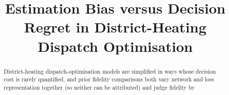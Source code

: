 \documentclass[a4paper,fleqn]{cas-sc}
\begin{document}
\title[mode=title]{%
  Estimation Bias versus Decision Regret in District-Heating Dispatch Optimisation}

\begin{abstract}
District-heating dispatch-optimisation models are simplified in ways whose decision
cost is rarely quantified, and prior fidelity comparisons both vary network and loss
representation together (so neither can be attributed) and judge fidelity by

\end{abstract}
\end{document}
